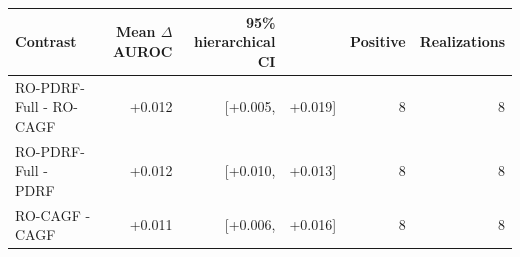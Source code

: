 \begin{tabular}{lrrrrr}
\toprule
Contrast & Mean $\Delta$ AUROC & 95\% hierarchical CI &  & Positive & Realizations \\
\midrule
RO-PDRF-Full - RO-CAGF & +0.012 & [+0.005, & +0.019] & 8 & 8 \\
RO-PDRF-Full - PDRF & +0.012 & [+0.010, & +0.013] & 8 & 8 \\
RO-CAGF - CAGF & +0.011 & [+0.006, & +0.016] & 8 & 8 \\
\bottomrule
\end{tabular}